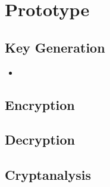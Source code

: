 \section{Prototype}


\subsection{Key Generation}

\bob
\generatekeysindemo
\generatekeysoutdemo

\begin{itemize}
\item
\end{itemize}


\subsection{Encryption}

\alice
\encryptindemo
\encryptoutdemo


\subsection{Decryption}

\bob
\decryptindemo
\decryptoutdemo


\subsection{Cryptanalysis}

\eve
\cryptanalyzeindemo
\cryptanalyzeoutdemo
